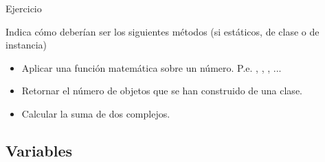 \documentclass[10pt,envcountsect,spanish]{beamer}
\begin{document}
\begin{frame}{Ejercicio}


\begin{ejercicio}{}
Indica cómo deberían ser los siguientes métodos (si estáticos, de clase o de instancia)
\begin{itemize}[leftmargin=\dimexpr 1cm]
\item Aplicar una función matemática sobre un número. P.e. , , , ... %
\item Retornar el número de objetos que se han construido de una clase. %
\item Calcular la suma de dos complejos. %
\end{itemize}
\end{ejercicio}
\end{frame}



\subsection{Variables}
\end{document}
